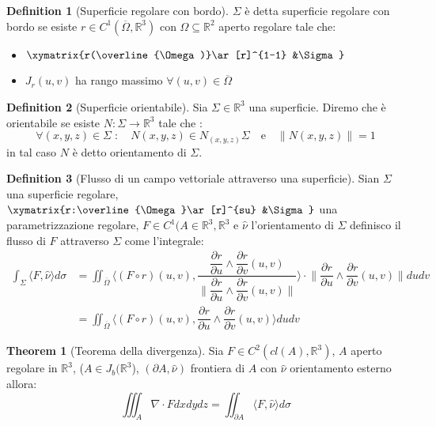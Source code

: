 \documentclass[leqno]{article}
\theoremstyle{definition}
\newtheorem{definition}{Definition}[section]
\numberwithin{equation}{section}
\newtheorem{theorem}{Theorem}[section]
\theoremstyle{remark}
\begin{document}
		\begin{definition}[Superficie regolare con bordo]
			$\Sigma$ è detta superficie regolare con bordo se esiste $r\in C^1(\overline{\Omega}, \mathbb{R}^3)$ con $\Omega \subseteq \mathbb{R}^2$ aperto regolare tale che:
			\begin{itemize}
				\item $\xymatrix{r(\overline{\Omega)}\ar[r]^{1-1} &\Sigma}$
				\item $J_r(u,v)$ ha rango massimo $\forall (u,v)\in \overline{\Omega}$
			\end{itemize}
		\end{definition}
		
		\begin{definition}[Superficie orientabile]
			Sia $\Sigma \in \mathbb{R}^3 $ una superficie. Diremo che è   orientabile se esiste $N:\Sigma \to \mathbb{R}^3$ tale che :
			\begin{equation}
				\forall(x,y,z)\in \Sigma \; : \quad N(x,y,z)\in N_{(x,y,z)}\Sigma \quad \text{e} \quad \lVert N(x,y,z) \rVert = 1
			\end{equation}
			in tal caso $N$ è detto orientamento di $\Sigma$.
		\end{definition}
		
		\begin{definition}[Flusso di un campo vettoriale attraverso una superficie]
			Sian $\Sigma$ una superficie regolare, $\xymatrix{r:\overline{\Omega}\ar[r]^{su} &\Sigma}$ una parametrizzazione regolare, $F\in C^1(A\in \mathbb{R}^3, \mathbb{R}^3$ e $\hat{\nu}$ l'orientamento di $\Sigma$ definisco il flusso di $F$ attraverso $\Sigma$ come l'integrale: 
			\begin{equation}
				\begin{aligned}
					\int_{\Sigma} \langle F, \hat{\nu}\rangle d \sigma &= \iint_{\overline{\Omega}}\langle \left(F \circ r\right) (u,v),\dfrac{ \dfrac{\partial r}{\partial u}\wedge \dfrac {\partial r}{\partial v} (u,v) }{\lVert \dfrac{\partial r}{\partial u}\wedge \dfrac{\partial r}{\partial v} (u,v) \rVert}\rangle \cdot  \lVert \dfrac{\partial r}{\partial u}\wedge \dfrac{\partial r}{\partial v} (u,v) \rVert dudv \\ &=\iint_{\overline{\Omega}}\langle \left(F \circ r\right) (u,v), \dfrac{\partial r}{\partial u}\wedge \dfrac {\partial r}{\partial v} (u,v) \rangle dudv
				\end{aligned}
			\end{equation}
			\end {definition}
			
			\begin{theorem}[Teorema della divergenza]
				Sia $F\in C^2(cl(A), \mathbb{R}^3)$, $A$ aperto regolare in $\mathbb{R}^3$, ($A\in J_b(\mathbb{R}^3$), $(\partial A, \hat{\nu})$ frontiera di $A$ con $\hat{\nu}$ orientamento esterno allora:
				\begin{equation}
					\iiint_A \nabla \cdot F dxdydz=\iint_{\partial A} \langle F, \hat{\nu} \rangle d\sigma
				\end{equation}
			\end{theorem}
			
			
		
\end{document}

